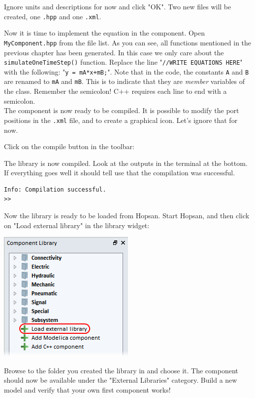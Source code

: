 \documentclass[a4paper,pdftex]{article}
\begin{document}
\begin{tutenumerate}
Ignore units and descriptions for now and click "OK".
Two new files will be created, one \texttt{.hpp} and one \texttt{.xml}.

Now it is time to implement the equation in the component.
Open \texttt{MyComponent.hpp} from the file list.
As you can see, all functions mentioned in the previous chapter has been generated.
In this case we only care about the \texttt{simulateOneTimeStep()} function.
Replace the line "\texttt{//WRITE EQUATIONS HERE}" with the following: "\texttt{y = mA*x+mB;}". Note that in the code, the constants \texttt{A} and \texttt{B} are renamed to \texttt{mA} and \texttt{mB}. This is to indicate that they are \textit{member} variables of the class.
Remember the semicolon!
C++ requires each line to end with a semicolon.\\
\newline\noindent
The component is now ready to be compiled. 
It is possible to modify the port positions in the \texttt{.xml} file, and to create a graphical icon.
Let's ignore that for now.

Click on the compile button in the toolbar:


The library is now compiled.
Look at the outputs in the terminal at the bottom. 
If everything goes well it should tell use that the compilation was successful. 

\begin{lstlisting}[basicstyle=\small\ttfamily]
Info: Compilation successful.
>> 
\end{lstlisting}

Now the library is ready to be loaded from Hopsan.
Start Hopsan, and then click on "Load external library" in the library widget:

\includegraphics[width=0.4\linewidth]{gfx/writingcomponents/loadlibrary.png}

Browse to the folder you created the library in and choose it.
The component should now be available under the "External Libraries" category.
Build a new model and verify that your own first component works!


\end{tutenumerate}
\end{document}
